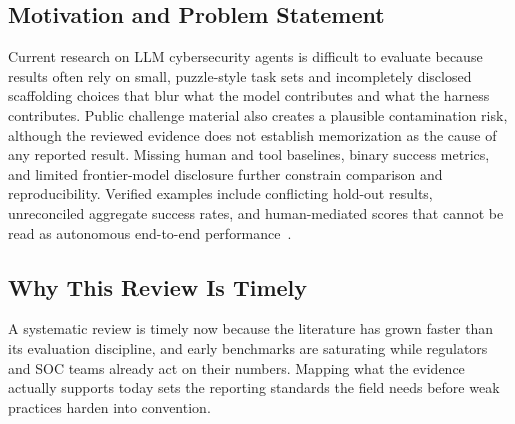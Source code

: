 
\subsection{Motivation and Problem Statement}
Current research on LLM cybersecurity agents is difficult to evaluate because results often rely on small, puzzle-style task sets and incompletely disclosed scaffolding choices that blur what the model contributes and what the harness contributes. Public challenge material also creates a plausible contamination risk, although the reviewed evidence does not establish memorization as the cause of any reported result. Missing human and tool baselines, binary success metrics, and limited frontier-model disclosure further constrain comparison and reproducibility. Verified examples include conflicting hold-out results, unreconciled aggregate success rates, and human-mediated scores that cannot be read as autonomous end-to-end performance~\cite{R0322_Wu_2025,R0320_Huang_2025,R0384_Xiao_2025}.

\subsection{Why This Review Is Timely}
A systematic review is timely now because the literature has grown faster than its evaluation discipline, and early benchmarks are saturating while regulators and SOC teams already act on their numbers. Mapping what the evidence actually supports today sets the reporting standards the field needs before weak practices harden into convention.

